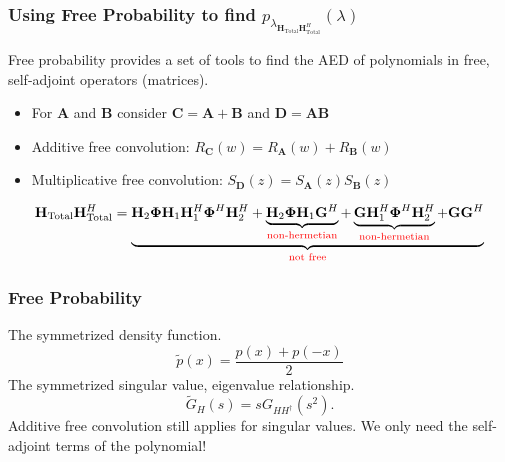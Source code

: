 \documentclass[10pt,tgadventor, onlymath]{beamer}
\begin{document}
\begin{frame}
\frametitle{Using Free Probability to find $p_{\lambda_{\mathbf{H}_{\text{Total}}\mathbf{H}_{\text{Total}}^H}}(\lambda)$}
Free probability provides a set of tools to find the AED of polynomials in free, self-adjoint operators (matrices).

\begin{itemize}
\item 
	For $\mathbf{A}$ and $\textbf{B}$ consider $\mathbf{C} = \mathbf{A} + \textbf{B}$ and $\mathbf{D} = \mathbf{A}\textbf{B}$
\item 
	Additive free convolution: $R_{\mathbf{C}}(w) = R_{\mathbf{A}}(w) + R_{\mathbf{B}}(w)$
\item 
	Multiplicative free convolution: $S_{\mathbf{D}}(z) = S_{\mathbf{A}}(z)S_{\mathbf{B}}(z)$
\end{itemize}

\begin{equation*}
\mathbf{H}_{\text{Total}}\mathbf{H}_{\text{Total}}^H 
= 
\underbrace{
\mathbf{H}_{2}\boldsymbol{\Phi}\mathbf{H}_{1}\mathbf{H}_{1}^H\boldsymbol{\Phi}^H\mathbf{H}_{2}^H +
\underbrace{\mathbf{H}_{2}\boldsymbol{\Phi}\mathbf{H}_{1}\mathbf{G}^H}_{\color{red}{\text{non-hermetian}}}+
\underbrace{\mathbf{G}\mathbf{H}_{1}^H\boldsymbol{\Phi}^H\mathbf{H}_{2}^H}_{\color{red}{\text{non-hermetian}}}+
\mathbf{G}\mathbf{G}^H
}_
{\color{red}{\text{not free}}}
\end{equation*}
\end{frame}

\begin{frame}
\frametitle{Free Probability}
The symmetrized density function.
\begin{equation*}
\tilde{p}(x) = \frac{p(x) + p(-x)}{2}
\end{equation*}
The symmetrized singular value, eigenvalue relationship.
\begin{equation*}\label{svd_aed_property}
\tilde{G}_{H}(s) = sG_{HH^{\dagger}}(s^2).
\end{equation*}
Additive free convolution still applies for singular values.
We only need the self-adjoint terms of the polynomial!
\end{frame}
\end{document}
